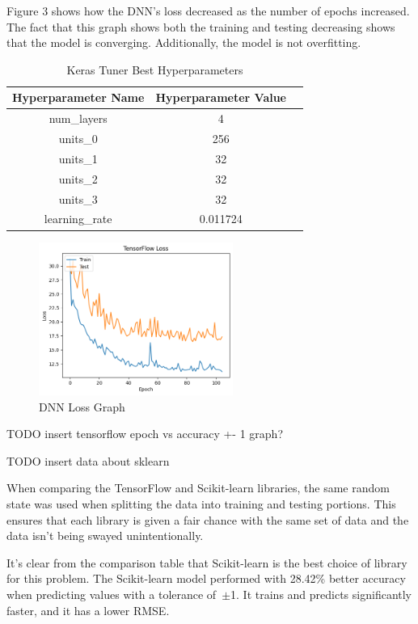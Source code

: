 \documentclass[lettersize,journal]{IEEEtran}
\begin{document}
Figure 3 shows how the DNN's loss decreased as the number of epochs increased. The fact that this graph shows both the training and testing decreasing shows that the model is converging. Additionally, the model is not overfitting. 

\begin{table}
\caption{Keras Tuner Best Hyperparameters}
\begin{center}
\begin{tabular}{ |c|c|c| }
    \hline
    Hyperparameter Name & Hyperparameter Value \\ 
    \hline
    num\_layers & 4 \\  
    \hline
    units\_0 & 256 \\
    \hline
    units\_1 & 32 \\
    \hline
    units\_2 & 32 \\
    \hline
    units\_3 & 32 \\
    \hline
    learning\_rate & 0.011724 \\
    \hline
\end{tabular}
\end{center}
\end{table}

\begin{figure}[!t]
    \centering
    \includegraphics[width=2.5in]{loss}
    \caption{DNN Loss Graph}
    \label{fig_sim}
    \end{figure}

TODO insert tensorflow epoch vs accuracy +- 1 graph? 

TODO insert data about sklearn 

When comparing the TensorFlow and Scikit-learn libraries, the same random state was used when splitting the data into training and testing portions. This ensures that each library is given a fair chance with the same set of data and the data isn't being swayed unintentionally. 

It's clear from the comparison table that Scikit-learn is the best choice of library for this problem. The Scikit-learn model performed with 28.42\% better accuracy when predicting values with a tolerance of~$\pm$1. It trains and predicts significantly faster, and it has a lower RMSE.
\end{document}
